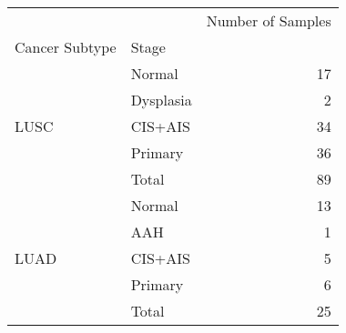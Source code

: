 \begin{tabular}{l|lr}
\toprule
     &       & Number of Samples \\
Cancer Subtype & Stage &                   \\
\midrule
\multirow{5}{*}{LUSC} & Normal &                17 \\
     & Dysplasia &                 2 \\
     & CIS+AIS &                34 \\
     & Primary &                36 \\
     & Total &                89 \\
\cline{1-3}
\multirow{5}{*}{LUAD} & Normal &                13 \\
     & AAH &                 1 \\
     & CIS+AIS &                 5 \\
     & Primary &                 6 \\
     & Total &                25 \\
\bottomrule
\end{tabular}
